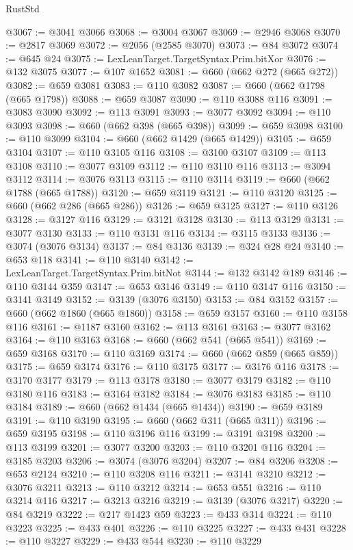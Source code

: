\begin{lexlean}{RustStd}
\begin{coremodule}
{\begin{coremodule}
{{{{{{{{{{{{{{{{{{{{{{{{{{{{{{{{{{{{{{{{{{{{{{{@3067 := @3041 @3066
@3068 := @3004 @3067
@3069 := @2946 @3068
@3070 := @2817 @3069
@3072 := @2056 (@2585 @3070)
@3073 := @84 @3072
@3074 := @645 @24
@3075 := LexLeanTarget.TargetSyntax.Prim.bitXor
@3076 := @132 @3075
@3077 := @107 @1652
@3081 := @660 (@662 @272 (@665 @272))
@3082 := @659 @3081
@3083 := @110 @3082
@3087 := @660 (@662 @1798 (@665 @1798))
@3088 := @659 @3087
@3090 := @110 @3088 @116
@3091 := @3083 @3090
@3092 := @113 @3091
@3093 := @3077 @3092
@3094 := @110 @3093
@3098 := @660 (@662 @398 (@665 @398))
@3099 := @659 @3098
@3100 := @110 @3099
@3104 := @660 (@662 @1429 (@665 @1429))
@3105 := @659 @3104
@3107 := @110 @3105 @116
@3108 := @3100 @3107
@3109 := @113 @3108
@3110 := @3077 @3109
@3112 := @110 @3110 @116
@3113 := @3094 @3112
@3114 := @3076 @3113
@3115 := @110 @3114
@3119 := @660 (@662 @1788 (@665 @1788))
@3120 := @659 @3119
@3121 := @110 @3120
@3125 := @660 (@662 @286 (@665 @286))
@3126 := @659 @3125
@3127 := @110 @3126
@3128 := @3127 @116
@3129 := @3121 @3128
@3130 := @113 @3129
@3131 := @3077 @3130
@3133 := @110 @3131 @116
@3134 := @3115 @3133
@3136 := @3074 (@3076 @3134)
@3137 := @84 @3136
@3139 := @324 @28 @24
@3140 := @653 @118
@3141 := @110 @3140
@3142 := LexLeanTarget.TargetSyntax.Prim.bitNot
@3144 := @132 @3142 @189
@3146 := @110 @3144 @359
@3147 := @653 @3146
@3149 := @110 @3147 @116
@3150 := @3141 @3149
@3152 := @3139 (@3076 @3150)
@3153 := @84 @3152
@3157 := @660 (@662 @1860 (@665 @1860))
@3158 := @659 @3157
@3160 := @110 @3158 @116
@3161 := @1187 @3160
@3162 := @113 @3161
@3163 := @3077 @3162
@3164 := @110 @3163
@3168 := @660 (@662 @541 (@665 @541))
@3169 := @659 @3168
@3170 := @110 @3169
@3174 := @660 (@662 @859 (@665 @859))
@3175 := @659 @3174
@3176 := @110 @3175
@3177 := @3176 @116
@3178 := @3170 @3177
@3179 := @113 @3178
@3180 := @3077 @3179
@3182 := @110 @3180 @116
@3183 := @3164 @3182
@3184 := @3076 @3183
@3185 := @110 @3184
@3189 := @660 (@662 @1434 (@665 @1434))
@3190 := @659 @3189
@3191 := @110 @3190
@3195 := @660 (@662 @311 (@665 @311))
@3196 := @659 @3195
@3198 := @110 @3196 @116
@3199 := @3191 @3198
@3200 := @113 @3199
@3201 := @3077 @3200
@3203 := @110 @3201 @116
@3204 := @3185 @3203
@3206 := @3074 (@3076 @3204)
@3207 := @84 @3206
@3208 := @653 @2124
@3210 := @110 @3208 @116
@3211 := @3141 @3210
@3212 := @3076 @3211
@3213 := @110 @3212
@3214 := @653 @551
@3216 := @110 @3214 @116
@3217 := @3213 @3216
@3219 := @3139 (@3076 @3217)
@3220 := @84 @3219
@3222 := @217 @1423 @59
@3223 := @433 @314
@3224 := @110 @3223
@3225 := @433 @401
@3226 := @110 @3225
@3227 := @433 @431
@3228 := @110 @3227
@3229 := @433 @544
@3230 := @110 @3229
}}}}}}}}}}}}}}}}}}}}}}}}}}}}}}}}}}}}}}}}}}}}}}}
\end{coremodule}}
\end{coremodule}
\end{lexlean}
